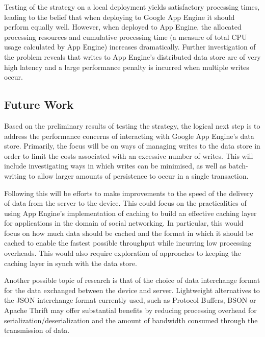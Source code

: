 \documentclass{article}
\begin{document}
Testing of the strategy on a local deployment yields satisfactory processing times, leading to the belief that when deploying to Google App Engine it should perform equally well. However, when deployed to App Engine, the allocated processing resources and cumulative processing time (a measure of total CPU usage calculated by App Engine) increases dramatically. Further investigation of the problem reveals that writes to App Engine's distributed data store are of very high latency and a large performance penalty is incurred when multiple writes occur.


\subsection{Future Work} %
\label{sub:future_work}

Based on the preliminary results of testing the strategy, the logical next step is to address the performance concerns of interacting with Google App Engine's data store. Primarily, the focus will be on ways of managing writes to the data store in order to limit the costs associated with an excessive number of writes. This will include investigating ways in which writes can be minimised, as well as batch-writing to allow larger amounts of persistence to occur in a single transaction.

Following this will be efforts to make improvements to the speed of the delivery of data from the server to the device. This could focus on the practicalities of using App Engine's implementation of caching to build an effective caching layer for applications in the domain of social networking. In particular, this would focus on how much data should be cached and the format in which it should be cached to enable the fastest possible throughput while incurring low processing overheads. This would also require exploration of approaches to keeping the caching layer in synch with the data store.

Another possible topic of research is that of the choice of data interchange format for the data exchanged between the device and server. Lightweight alternatives to the JSON interchange format currently used, such as Protocol Buffers, BSON or Apache Thrift may offer substantial benefits by reducing processing overhead for serialization/deserialization and the amount of bandwidth consumed through the transmission of data.

\end{document}
